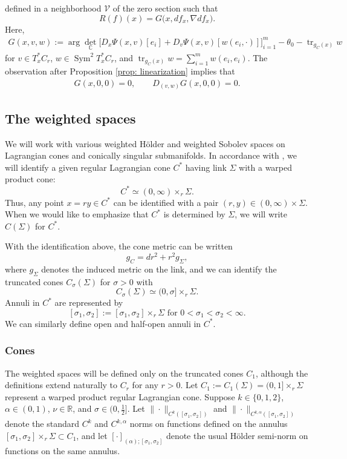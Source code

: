 \documentclass[11pt]{amsart}
\theoremstyle{definition}
\theoremstyle{remark}
\newcommand{\C}{\mathbb{C}}
\newcommand{\R}{\mathbb{R}}
\begin{document}
defined in a neighborhood $\mathcal V$ of the zero section such that
\[
    R(f)(x)
    =
    G\big(x,df_x,\nabla df_x\big).
\]
Here,
\[
\begin{aligned}
    G(x,v,w)
    :=
    \operatorname{arg}
    \det_{\C}\Big[
    D_x\Psi(x,v)[e_i]
    +
    D_v\Psi(x,v)[w(e_i,\cdot)]
    \Big]_{i=1}^m-\theta_0-\operatorname{tr}_{g_C(x)} w
\end{aligned}
\]
for \(v\in T_x^*C_r\), \(w\in \operatorname{Sym}^2T_x^*C_r\), and
$\operatorname{tr}_{g_C(x)}w=\sum_{i=1}^m w(e_i,e_i)$.
The observation after Proposition \ref{prop: linearization} implies that
\begin{align}
\label{eq: vanishing-H}
    G(x,0,0)=0,
    \qquad
    D_{(v,w)}G(x,0,0)=0.
\end{align}


\subsection{The weighted spaces}
We will work with various weighted H\"older and weighted Sobolev spaces on Lagrangian cones and conically singular submanifolds. In accordance with \cite{Sm93}, we will identify a given regular Lagrangian cone $C^\ast$ having link $\Sigma$ with a warped product cone: 
\[C^\ast \simeq (0,\infty) \times_r \Sigma.\]
Thus, any point $x = ry \in C^\ast$ can be identified with a pair $(r,y) \in (0,\infty) \times \Sigma$. When we would like to emphasize that $C^\ast$ is determined by $\Sigma$, we will write $C(\Sigma)$ for $C^\ast$.

With the identification above, the cone metric can be written
\[g_C = dr^2 + r^2 g_\Sigma,\]
where $g_\Sigma$ denotes the induced metric on the link, and we can identify the truncated cones $C_{\sigma}(\Sigma)$ for $\sigma > 0$ with
\[C_{\sigma}(\Sigma) \simeq (0,\sigma] \times_r \Sigma.\]
Annuli in $C^\ast$ are represented by 
\[[\sigma_1, \sigma_2] := [\sigma_1, \sigma_2] \times_r \Sigma \text{ for } 0 < \sigma_1 < \sigma_2 < \infty.\]
We can similarly define open and half-open annuli in $C^\ast$.


\subsubsection{Cones}
The weighted spaces will be defined only on the truncated cones $C_1$, although the definitions extend naturally to $C_r$ for any $r > 0$. Let $C_1 := C_1(\Sigma) = (0,1]\times_r \Sigma$ represent a warped product regular Lagrangian cone. Suppose $k \in \{0,1,2\}$, $\alpha \in (0,1)$, $\nu \in \R$, and $\sigma \in (0,\frac{1}{2}]$. Let $\|\cdot\|_{C^k([\sigma_1,\sigma_2])}$ and $\|\cdot\|_{C^{k,\alpha}([\sigma_1,\sigma_2])}$ denote the standard $C^k$ and $C^{k,\alpha}$ norms on functions defined on the annulus $[\sigma_1,\sigma_2] \times_r \Sigma \subset C_1$, and let $[\cdot]_{(\alpha);[\sigma_1,\sigma_2]}$ denote the usual H\"older semi-norm on functions on the same annulus. 
\end{document}
